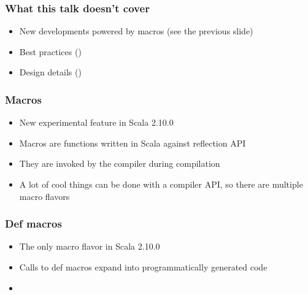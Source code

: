 \documentclass[svgnames,hyperref={bookmarks=false}]{beamer}
\begin{document}
\begin{frame}[fragile]
\frametitle{What this talk doesn't cover}

\begin{itemize}
\item New developments powered by macros (see the previous slide)
\item Best practices ()
\item Design details ()
\end{itemize}
\end{frame}

\begin{frame}[fragile]
\frametitle{}

\vskip40pt
\begin{center}
\end{center}
\end{frame}

\begin{frame}[fragile]
\frametitle{Macros}

\begin{itemize}
\item New experimental feature in Scala 2.10.0
\item Macros are functions written in Scala against reflection API
\item They are invoked by the compiler during compilation
\item A lot of cool things can be done with a compiler API, so there are multiple macro flavors
\end{itemize}
\end{frame}

\begin{frame}[fragile]
\frametitle{Def macros}

\begin{itemize}
\item The only macro flavor in Scala 2.10.0
\item Calls to def macros expand into programmatically generated code
\item {}
\end{itemize}
\end{frame}
\end{document}
